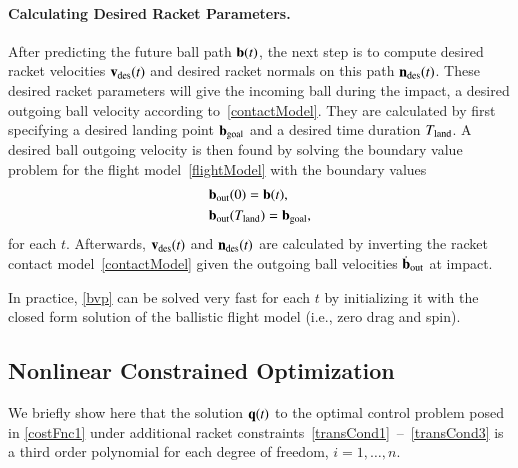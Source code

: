 \paragraph{\textbf{Calculating Desired Racket Parameters}.}\label{calcDesRacket} After predicting the future ball path $\boldsymbol{\mathrm{b}}(t)$, the next step is to compute desired racket velocities $\boldsymbol{\mathrm{v}}_{\mathrm{des}}(t)$ and desired racket normals on this path $\boldsymbol{\mathrm{n}}_{\mathrm{des}}(t)$. These desired racket parameters will give the incoming ball during the impact, a desired outgoing ball velocity according to~\eqref{contactModel}. They are calculated by first specifying a desired landing point $\boldsymbol{\mathrm{b}}_{\mathrm{goal}}$ and a desired time duration $T_{\mathrm{land}}$. A desired ball outgoing velocity is then found by solving the boundary value problem for the flight model~\eqref{flightModel} with the boundary values
%
\begin{gather}
\begin{aligned}
&\boldsymbol{\mathrm{b}}_{\mathrm{out}}(0) = \boldsymbol{\mathrm{b}}(t), \\
&\boldsymbol{\mathrm{b}}_{\mathrm{out}}(T_{\mathrm{land}}) = \boldsymbol{\mathrm{b}}_{\mathrm{goal}},
\label{bvp}
\end{aligned}
\end{gather}
%
\noindent for each $t$. Afterwards, $\boldsymbol{\mathrm{v}}_{\mathrm{des}}(t)$ and $\boldsymbol{\mathrm{n}}_{\mathrm{des}}(t)$ are calculated by inverting the racket contact model~\eqref{contactModel} given the outgoing ball velocities $\dot{\boldsymbol{\mathrm{b}}}_{\mathrm{out}}$ at impact.

In practice, \eqref{bvp} can be solved very fast for each $t$ by initializing it with the closed form solution of the ballistic flight model (i.e., zero drag and spin). 
%
%
\subsection{Nonlinear Constrained Optimization}\label{nco1}
%
We briefly show here that the solution $\boldsymbol{\mathrm{q}}(t)$ to the optimal control problem posed in \eqref{costFnc1} under additional racket constraints~\mbox{\eqref{transCond1} -- \eqref{transCond3}} is a third order polynomial for each degree of freedom, $i = 1, \ldots, n$. 
%
